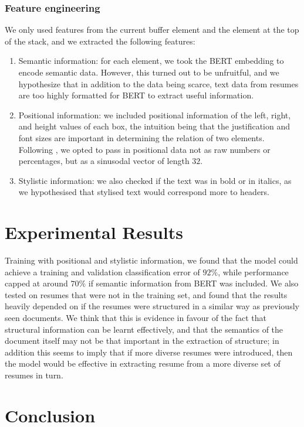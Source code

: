 \documentclass[11pt]{article}
\begin{document}
\subsubsection{Feature engineering}
We only used features from the current buffer element and the element at the top of the stack, and we extracted the following features: 
\begin{enumerate}
	\item Semantic information: for each element, we took the BERT \citep{devlin2018bert} embedding to encode semantic data. However, this turned out to be unfruitful, and we hypothesize that in addition to the data being scarce, text data from resumes are too highly formatted for BERT to extract useful information. 
	\item Positional information: we included positional information of the left, right, and height values of each box, the intuition being that the justification and font sizes are important in determining the relation of two elements. Following \citep{vaswani2017attention}, we opted to pass in positional data not as raw numbers or percentages, but as a sinusodal vector of length $32$. 
	\item Stylistic information: we also checked if the text was in bold or in italics, as we hypothesised that stylised text would correspond more to headers. 
\end{enumerate}

\section{Experimental Results}

Training with positional and stylistic information, we found that the model could achieve a training and validation classification error of $92\%$, while performance capped at around $70\%$ if semantic information from BERT was included. We also tested on resumes that were not in the training set, and found that the results heavily depended on if the resumes were structured in a similar way as previously seen documents. We think that this is evidence in favour of the fact that structural information can be learnt effectively, and that the semantics of the document itself may not be that important in the extraction of structure; in addition this seems to imply that if more diverse resumes were introduced, then the model would be effective in extracting resume from a more diverse set of resumes in turn.
\section{Conclusion}
\end{document}
